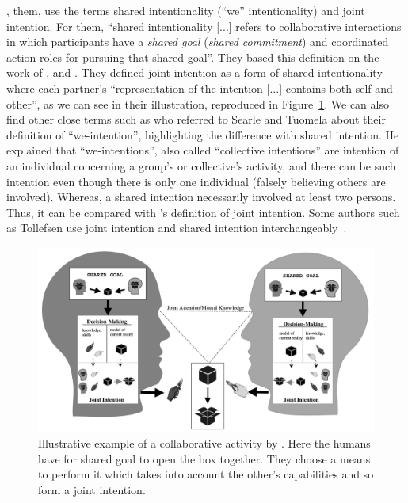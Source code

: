 \documentclass[a4paper,11pt,twoside]{StyleThese}
\begin{document}
\cite{tomasello_2005_understanding}, them, use the terms shared intentionality (``we'' intentionality) and joint intention. For them, ``shared intentionality [...] refers to collaborative interactions in which participants have a \emph{shared goal} (\emph{shared commitment}) and coordinated action roles for pursuing that shared goal''. They based this definition on the work of \cite{gilbert_1989_social}, \cite{searle_1983_intentionality} and \cite{tuomela_1995_importance}. They defined joint intention as a form of shared intentionality where each partner's ``representation of the intention [...] contains both self and other'', as we can see in their illustration, reproduced in Figure~\ref{chap1:fig:ji}. We can also find other close terms such as \cite{bratman_1993_shared} who referred to Searle and Tuomela about their definition of ``we-intention'', highlighting the difference with shared intention. He explained that ``we-intentions'', also called ``collective intentions'' are intention of an individual concerning a group's or collective's activity, and there can be such intention even though there is only one individual (falsely believing others are involved). Whereas, a shared intention necessarily involved at least two persons. Thus, it can be compared with \citeauthor{tomasello_2005_understanding}'s definition of joint intention. Some authors such as Tollefsen use joint intention and shared intention interchangeably~\citep{tollefsen_2005_let}.

 \begin{figure}[!ht]
 	\includegraphics[width=\linewidth]{figures/chapter1/shared_representation.png}
 	\caption{Illustrative example of a collaborative activity by \cite{tomasello_2005_understanding}. Here the humans have for shared goal to open the box together. They choose a means to perform it which takes into account the other's capabilities and so form a joint	intention.}
 	\label{chap1:fig:ji}
 \end{figure}
\end{document}
